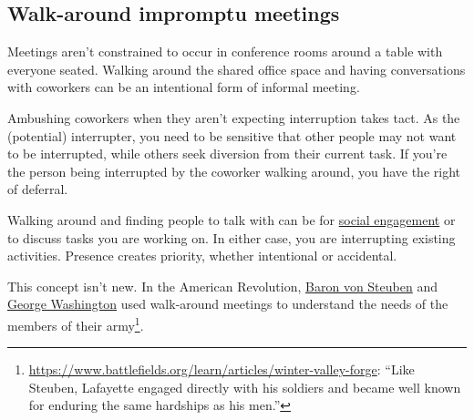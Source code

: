 \subsection*{Walk-around impromptu meetings\label{sec:walk-arounds}}

Meetings aren't constrained to occur in conference rooms around a table with everyone seated. Walking around the shared office space and having conversations with coworkers can be an intentional form of informal meeting. 

Ambushing coworkers when they aren't expecting interruption takes tact. As the (potential) interrupter, you need to be sensitive that other people may not want to be interrupted, while others seek diversion from their current task. If you're the person being interrupted by the coworker walking around, you have the right of deferral. 


Walking around and finding people to talk with can be for 
\hyperref[sec:socializing]{social engagement} 
or to discuss tasks you are working on. 
In either case, you are interrupting existing activities. Presence creates priority,
whether intentional or accidental.





This concept isn't new. 
In the American Revolution, \href{https://en.wikipedia.org/wiki/Friedrich_Wilhelm_von_Steuben}{Baron von Steuben}
and 
\href{https://en.wikipedia.org/wiki/George_Washington}{George Washington}
used walk-around meetings to understand the needs of the members of their army\footnote{\href{https://www.battlefields.org/learn/articles/winter-valley-forge}{https://www.battlefields.org/learn/articles/winter-valley-forge}: ``Like Steuben, Lafayette engaged directly with his soldiers and became well known for enduring the same hardships as his men.''}.
